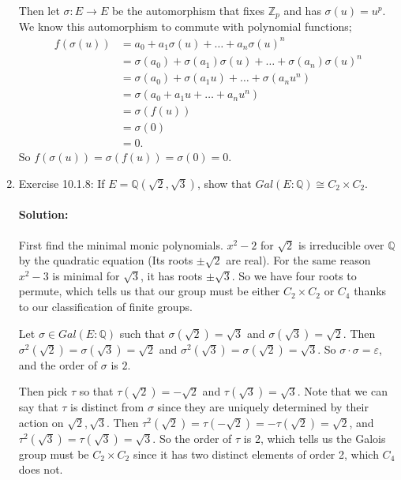 \documentclass{article}
\begin{document}
\begin{enumerate}
    Then let $\sigma:E\to E$ be the automorphism that fixes $\mathbb{Z}_p$ and has
    $\sigma(u)=u^{p}$. We know this automorphism to commute with polynomial functions;
    \begin{align*}
        f(\sigma(u))&= a_0+a_1\sigma(u)+\ldots+a_n\sigma(u)^{n}\\
        &=  \sigma(a_0)+\sigma(a_1)\sigma(u)+\ldots+\sigma(a_n)\sigma(u)^{n} \\
        &=  \sigma(a_0)+\sigma(a_1u)+\ldots+\sigma(a_nu^{n}) \\
        &=  \sigma(a_0+a_1u+\ldots+a_nu^{n}) \\
        &=  \sigma(f(u))\\
        &=\sigma(0)\\
        &=0
    .\end{align*}
    So $f(\sigma(u))=\sigma(f(u))=\sigma(0)=0$.

\item Exercise 10.1.8: If $E= {\mathbb Q}(\sqrt{2}, \sqrt{3} )$, show that $Gal(E:{\mathbb Q})\cong C_2\times C_2$.

    \paragraph{Solution:} First find the minimal monic polynomials. $x^2-2$ for $\sqrt{2} $ is 
    irreducible over $\mathbb{Q}$ by the quadratic equation (Its roots $\pm \sqrt{2} $ are real). For the 
    same reason $x^2-3$ is minimal for $\sqrt{3}$, it has roots $\pm\sqrt{3} $. So we have 
    four roots to permute, which tells us that our group must be either $C_2\times C_2$ or $C_4$ thanks
    to our classification of finite groups.

    Let $\sigma \in Gal(E:\mathbb{Q})$ such that $\sigma(\sqrt{2})=\sqrt{3}$ and 
    $\sigma(\sqrt{3} )=\sqrt{2} $. Then $\sigma^2(\sqrt{2} ) =\sigma(\sqrt{3})=\sqrt{2}$
    and $\sigma^2(\sqrt{3} )=\sigma(\sqrt{2} )=\sqrt{3} $. So $\sigma\cdot \sigma=\varepsilon$, and
    the order of $\sigma$ is $2$.

    Then pick $\tau$ so that $\tau(\sqrt{2})=-\sqrt{2} $ and $\tau(\sqrt{3})=\sqrt{3} $. Note that we
    can say that $\tau$ is distinct from $\sigma$ since they are uniquely determined by their action
    on $\sqrt{2} ,\sqrt{3} $. Then $\tau^2(\sqrt{2})=\tau(-\sqrt{2} ) =-\tau(\sqrt{2} )=\sqrt{2} $, and 
    $\tau^2(\sqrt{3})=\tau(\sqrt{3} )=\sqrt{3} $. So the order of $\tau$ is 2, which tells us the Galois
    group must be $C_2\times C_2$ since it has two distinct elements of order 2, which $C_4$ does not.

\end{enumerate}
\end{document}
